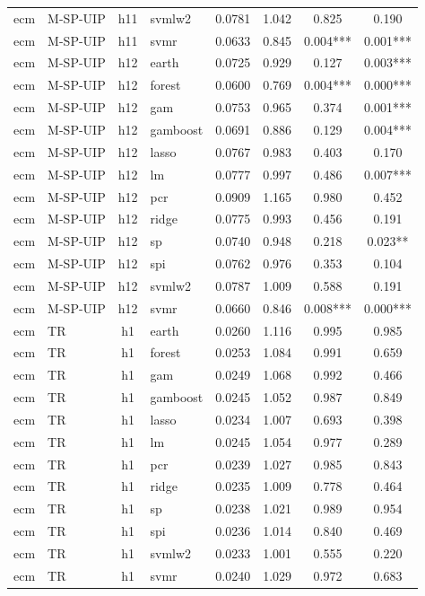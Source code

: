 \begin{ThreePartTable}
\begin{longtable}[t]{llclcccc}
ecm & M-SP-UIP & h11 & svmlw2 & 0.0781 & 1.042 & 0.825 & 0.190\\
ecm & M-SP-UIP & h11 & svmr & 0.0633 & 0.845 & 0.004*** & 0.001***\\
\addlinespace
ecm & M-SP-UIP & h12 & earth & 0.0725 & 0.929 & 0.127 & 0.003***\\
ecm & M-SP-UIP & h12 & forest & 0.0600 & 0.769 & 0.004*** & 0.000***\\
ecm & M-SP-UIP & h12 & gam & 0.0753 & 0.965 & 0.374 & 0.001***\\
ecm & M-SP-UIP & h12 & gamboost & 0.0691 & 0.886 & 0.129 & 0.004***\\
ecm & M-SP-UIP & h12 & lasso & 0.0767 & 0.983 & 0.403 & 0.170\\
ecm & M-SP-UIP & h12 & lm & 0.0777 & 0.997 & 0.486 & 0.007***\\
ecm & M-SP-UIP & h12 & pcr & 0.0909 & 1.165 & 0.980 & 0.452\\
ecm & M-SP-UIP & h12 & ridge & 0.0775 & 0.993 & 0.456 & 0.191\\
ecm & M-SP-UIP & h12 & sp & 0.0740 & 0.948 & 0.218 & 0.023**\\
ecm & M-SP-UIP & h12 & spi & 0.0762 & 0.976 & 0.353 & 0.104\\
ecm & M-SP-UIP & h12 & svmlw2 & 0.0787 & 1.009 & 0.588 & 0.191\\
ecm & M-SP-UIP & h12 & svmr & 0.0660 & 0.846 & 0.008*** & 0.000***\\
\addlinespace
ecm & TR & h1 & earth & 0.0260 & 1.116 & 0.995 & 0.985\\
ecm & TR & h1 & forest & 0.0253 & 1.084 & 0.991 & 0.659\\
ecm & TR & h1 & gam & 0.0249 & 1.068 & 0.992 & 0.466\\
ecm & TR & h1 & gamboost & 0.0245 & 1.052 & 0.987 & 0.849\\
ecm & TR & h1 & lasso & 0.0234 & 1.007 & 0.693 & 0.398\\
ecm & TR & h1 & lm & 0.0245 & 1.054 & 0.977 & 0.289\\
ecm & TR & h1 & pcr & 0.0239 & 1.027 & 0.985 & 0.843\\
ecm & TR & h1 & ridge & 0.0235 & 1.009 & 0.778 & 0.464\\
ecm & TR & h1 & sp & 0.0238 & 1.021 & 0.989 & 0.954\\
ecm & TR & h1 & spi & 0.0236 & 1.014 & 0.840 & 0.469\\
ecm & TR & h1 & svmlw2 & 0.0233 & 1.001 & 0.555 & 0.220\\
ecm & TR & h1 & svmr & 0.0240 & 1.029 & 0.972 & 0.683\\

\end{longtable}
\end{ThreePartTable}
